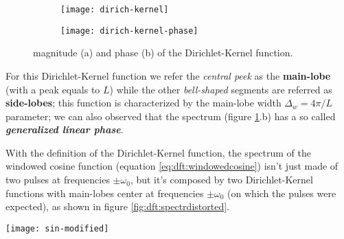 		\begin{figure}[bht]
			\begin{subfigure}{0.48\linewidth}
				\centering \texttt{[image: dirich-kernel]} \caption{}
			\end{subfigure}
			\begin{subfigure}{0.48\linewidth}
				\centering \texttt{[image: dirich-kernel-phase]} \caption{}
			\end{subfigure}
			\caption{magnitude (a) and phase (b) of the Dirichlet-Kernel function.}
			\label{fig:dft:dirichkernel}
		\end{figure}
		
		\noindent For this Dirichlet-Kernel function we refer the \textit{central peek} as the \textbf{main-lobe} (with a peak equals to $L$) while the other \textit{bell-shaped} segments are referred as \textbf{side-lobes}; this function is characterized by the main-lobe width $\Delta_w = 4\pi/L$ parameter; we can also observed that the spectrum (figure \ref{fig:dft:dirichkernel}.b) has a so called \textbf{\textit{generalized linear phase}}. \vspace{3mm}
		
		With the definition of the Dirichlet-Kernel function, the spectrum of the windowed cosine function (equation \ref{eq:dft:windowedcosine}) isn't just made of two pulses at frequencies $\pm \omega_0$, but it's composed by two Dirichlet-Kernel functions with main-lobes center at frequencies $\pm\omega_0$ (on which the pulses were expected), as shown in figure \ref{fig:dft:spectrdistorted}.
		
		\begin{SCfigure}[2][bht]
			\centering \texttt{[image: sin-modified]}
			\caption{spectrum of the signal  $v(n)= x(n)w(n)$ that's distorted due to the windowing.}
			\label{fig:dft:spectrdistorted}
		\end{SCfigure}  
	
